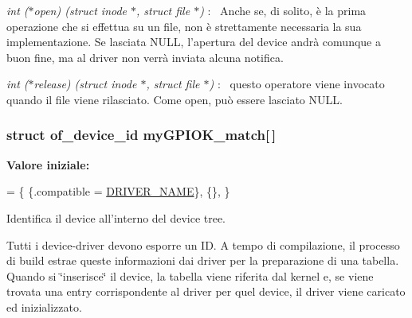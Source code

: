 \begin{DoxyItemize}
\item {\itshape int ($\ast$open) (struct inode $\ast$, struct file $\ast$)} \+:~\newline
 Anche se, di solito, è la prima operazione che si effettua su un file, non è strettamente necessaria la sua implementazione. Se lasciata N\+U\+L\+L, l'apertura del device andrà comunque a buon fine, ma al driver non verrà inviata alcuna notifica.
\item {\itshape int ($\ast$release) (struct inode $\ast$, struct file $\ast$)} \+:~\newline
 questo operatore viene invocato quando il file viene rilasciato. Come open, può essere lasciato N\+U\+L\+L. 
\end{DoxyItemize}\hypertarget{group___linux-_driver_gab59f49dc0fe8d885c73752b8a8163d0e}{
\subsubsection[{my\+G\+P\+I\+O\+K\+\_\+match}]{\setlength{\rightskip}{0pt plus 5cm}struct of\+\_\+device\+\_\+id my\+G\+P\+I\+O\+K\+\_\+match\mbox{[}$\,$\mbox{]}\hspace{0.3cm}{\ttfamily [static]}}}\label{group___linux-_driver_gab59f49dc0fe8d885c73752b8a8163d0e}
{\bfseries Valore iniziale\+:}
\begin{DoxyCode}
= \{
        \{.compatible = \hyperlink{group___linux-_driver_ga25634d21648ca7fb7a2aca614bafaaeb}{DRIVER\_NAME}\},
        \{\},
\}
\end{DoxyCode}


Identifica il device all'interno del device tree. 

Tutti i device-\/driver devono esporre un I\+D. A tempo di compilazione, il processo di build estrae queste informazioni dai driver per la preparazione di una tabella. Quando si \char`\"{}inserisce\char`\"{} il device, la tabella viene riferita dal kernel e, se viene trovata una entry corrispondente al driver per quel device, il driver viene caricato ed inizializzato. 